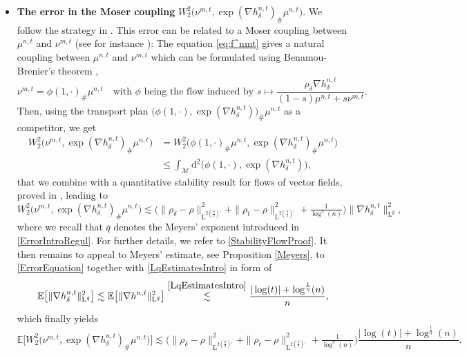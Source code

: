 \documentclass[11pt,a4paper,oneside]{amsart}
\numberwithin{equation}{section}
\newcommand{\dd}{\mathrm{d}}
\newcommand{\LL}{\mathrm{L}}
\begin{document}
\begin{itemize}
\item \textbf{The error in the Moser coupling} $W^2_2\big(\nu^{m,t},\exp(\nabla h^{n,t}_\delta)_\#\mu^{n,t}\big)$. We follow the strategy in \cite{ambrosio2019finer}. This error can be related to a Moser coupling between $\mu^{n,t}$ and $\nu^{m,t}$ (see for instance \cite[Appendix p. 16]{OldNewVillani}): The equation \eqref{eq:f^nmt} gives a natural coupling between $\mu^{n,t}$ and $\nu^{m,t}$ which can be formulated using Benamou-Brenier's theorem \cite{benamou2000computational},
%
$$\nu^{m,t}=\phi(1,\cdot)_\#\mu^{n,t}\quad\text{with $\phi$ being the flow induced by $s\mapsto \frac{\rho_\delta\nabla h^{n,t}_\delta}{(1-s)\mu^{n,t}+s\nu^{m,t}}$}.$$
%
Then, using the transport plan $\big(\phi(1,\cdot),\exp(\nabla h^{n,t}_\delta)\big)_\#\mu^{n,t}$ as a competitor, we get
%
\begin{align*}
%
W^2_2\big(\nu^{m,t},\exp(\nabla h^{n,t}_\delta)_\#\mu^{n,t}\big)&=W^2_2\big(\phi(1,\cdot)_\#\mu^{n,t},\exp(\nabla h^{n,t}_\delta)_\#\mu^{n,t}\big)\\
&\leq \int_{\mathcal{M}}\dd^2\big(\phi(1,\cdot),\exp(\nabla h^{n,t}_\delta)\big),
%
\end{align*}
%
that we combine with a quantitative stability result for flows of vector fields, proved in \cite[Proposition A.1]{ambrosio2019finer}, leading to
%
$$W^2_2\big(\nu^{m,t},\exp(\nabla h^{n,t}_\delta)_\#\mu^{n,t}\big)\lesssim\big(\|\rho_{\delta}-\rho\|^{2}_{\LL^{2(\frac{\bar q}{2})'}}+\|\rho_{t}-\rho\|^{2}_{\LL^{2(\frac{\bar q}{2})'}}+\tfrac{1}{\log^{\upsilon}(n)}\big)\|\nabla h^{n,t}_\delta\|^2_{\LL^{\bar{q}}},$$
%
%
where we recall that $\bar{q}$ denotes the Meyers' exponent introduced in \eqref{ErrorIntroRegul}. For further details, we refer to \eqref{StabilityFlowProof}. It then remains to appeal to Meyers' estimate, see Proposition \ref{Meyers}, to \eqref{ErrorEquation} together with \eqref{LqEstimatesIntro} in form of 
%
$$\mathbb{E}\big[\|\nabla h^{n,t}_\delta\|^2_{\LL^{\bar{q}}}\big]\lesssim  \mathbb{E}\big[\|\nabla h^{n,t}\|^2_{\LL^{\bar{q}}}\big]\stackrel{\eqref{LqEstimatesIntro}}{\lesssim}\frac{\vert\log(t)\vert+\log^{\frac{1}{\eta}}(n)}{n},$$
%
which finally yields
%
\begin{equation}\label{EstimateMoserCoupling}
%
\mathbb{E}\big[W^2_2\big(\nu^{m,t},\exp(\nabla h^{n,t}_\delta)_\#\mu^{n,t}\big)\big]\lesssim \big(\|\rho_{\delta}-\rho\|^{2}_{\LL^{2(\frac{\bar q}{2})'}}+\|\rho_{t}-\rho\|^{2}_{\LL^{2(\frac{\bar q}{2})'}}+\tfrac{1}{\log^{\upsilon}(n)}\big)\frac{\vert\log(t)\vert+\log^{\frac{1}{\eta}}(n)}{n}.
%
\end{equation}
%
\end{itemize}
\end{document}
